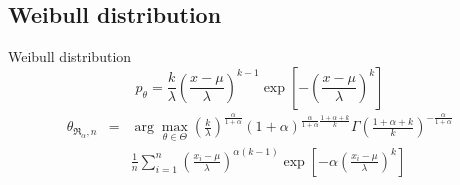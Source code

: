 \documentclass[11pt,a4paper]{beamer}
\newcommand{\amtiT}{\arg \max_{\theta \in \Theta}}
\newcommand{\fa}{\frac{\alpha}{1+\alpha}}
\begin{document}
\subsection{Weibull distribution}
\begin{frame}{Weibull distribution} %
	\begin{equation*}
		p_\theta =  \frac{k}{\lambda} \left( \frac{x-\mu}{\lambda} \right)^{k-1} \exp \left[ -\left( \frac{x-\mu}{\lambda} \right)^k \right] 
	\end{equation*}
	\begin{eqnarray}
		\theta_{\mathfrak{R}_\alpha,n} & = & \amtiT \left( \frac{k}{\lambda} \right)^\fa (1+\alpha)^{\fa\frac{1+\alpha+k}{k}} \Gamma\left(\frac{1+\alpha+k}{k}\right)^{-\fa} \nonumber \\
							&& \frac{1}{n}\sum_{i=1}^n \left( \frac{x_i-\mu}{\lambda}\right)^{\alpha(k-1)} \exp\left[-\alpha \left(\frac{x_i-\mu}{\lambda}\right)^k\right] \nonumber
	\end{eqnarray}
\end{frame}
\end{document}
